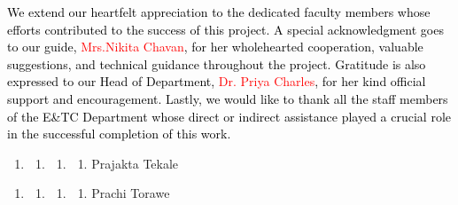 \documentclass[letterpaper]{article}
\newcounter{saveenum}
\newcommand\liststyleWWNumvi{%
\renewcommand\theenumi{\Alph{enumi}}
\renewcommand\theenumii{\Alph{enumi}.\Alph{enumii}}
\renewcommand\theenumiii{\Alph{enumi}.\Alph{enumii}.\Alph{enumiii}}
\renewcommand\theenumiv{\arabic{enumiv}}
\renewcommand\labelenumi{\theenumi}
\renewcommand\labelenumii{\theenumii}
\renewcommand\labelenumiii{\theenumiii}
\renewcommand\labelenumiv{\theenumiv.}
}
\begin{document}
\bigskip


\bigskip


\bigskip

\textcolor{black}{We extend our heartfelt appreciation to the dedicated faculty members whose efforts contributed to the
success of this project. A special acknowledgment goes to our guide, }\textcolor{red}{Mrs.Nikita
Chavan}\textcolor{black}{, for her wholehearted cooperation, valuable suggestions, and technical guidance throughout
the project. Gratitude is also expressed to our Head of Department, }\textcolor{red}{Dr. Priya
Charles}\textcolor{black}{, for her kind official support and encouragement. Lastly, we would like to thank all the
staff members of the E\&TC Department whose direct or indirect assistance played a crucial role in the successful
completion of this work.}


\bigskip


\bigskip


\bigskip


\bigskip


\bigskip


\bigskip


\bigskip


\bigskip


\bigskip

\liststyleWWNumvi
\begin{enumerate}
\item \begin{enumerate}
\item \begin{enumerate}
\item \begin{enumerate}
\item \textcolor[rgb]{0.09019608,0.21176471,0.3647059}{Prajakta Tekale}
\end{enumerate}
\end{enumerate}
\end{enumerate}
\end{enumerate}

\bigskip

\liststyleWWNumvi
\setcounter{saveenum}{\value{enumi}}
\begin{enumerate}
\setcounter{enumi}{\value{saveenum}}
\item \setcounter{saveenum}{\value{enumii}}
\begin{enumerate}
\setcounter{enumii}{\value{saveenum}}
\item \setcounter{saveenum}{\value{enumiii}}
\begin{enumerate}
\setcounter{enumiii}{\value{saveenum}}
\item \setcounter{saveenum}{\value{enumiv}}
\begin{enumerate}
\setcounter{enumiv}{\value{saveenum}}
\item \textcolor[rgb]{0.09019608,0.21176471,0.3647059}{Prachi Torawe}
\end{enumerate}
\end{enumerate}
\end{enumerate}
\end{enumerate}
\end{document}
